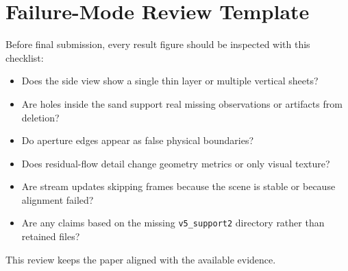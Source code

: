 \documentclass[conference]{IEEEtran}
\begin{document}
\section{Failure-Mode Review Template}
Before final submission, every result figure should be inspected with this checklist:
\begin{itemize}
\item Does the side view show a single thin layer or multiple vertical sheets?
\item Are holes inside the sand support real missing observations or artifacts from deletion?
\item Do aperture edges appear as false physical boundaries?
\item Does residual-flow detail change geometry metrics or only visual texture?
\item Are stream updates skipping frames because the scene is stable or because alignment failed?
\item Are any claims based on the missing \texttt{v5\_support2} directory rather than retained files?
\end{itemize}
This review keeps the paper aligned with the available evidence.



\end{document}
